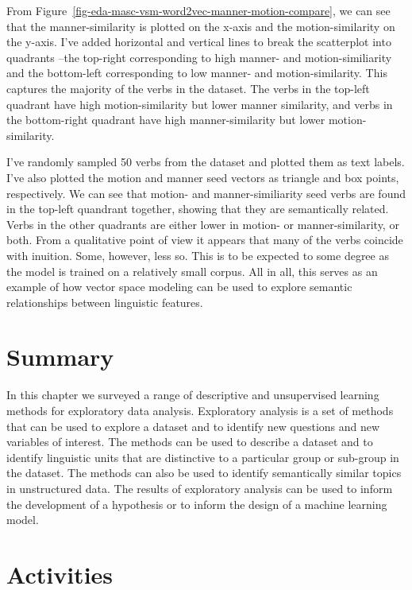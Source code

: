 \documentclass[
  letterpaper,
  DIV=11,
  numbers=noendperiod]{scrreport}
\theoremstyle{definition}
\theoremstyle{remark}
\begin{document}
From Figure~\ref{fig-eda-masc-vsm-word2vec-manner-motion-compare}, we
can see that the manner-similarity is plotted on the x-axis and the
motion-similarity on the y-axis. I've added horizontal and vertical
lines to break the scatterplot into quadrants --the top-right
corresponding to high manner- and motion-similiarity and the bottom-left
corresponding to low manner- and motion-similarity. This captures the
majority of the verbs in the dataset. The verbs in the top-left quadrant
have high motion-similarity but lower manner similarity, and verbs in
the bottom-right quadrant have high manner-similarity but lower
motion-similarity.

I've randomly sampled 50 verbs from the dataset and plotted them as text
labels. I've also plotted the motion and manner seed vectors as triangle
and box points, respectively. We can see that motion- and
manner-similiarity seed verbs are found in the top-left quandrant
together, showing that they are semantically related. Verbs in the other
quadrants are either lower in motion- or manner-similarity, or both.
From a qualitative point of view it appears that many of the verbs
coincide with inuition. Some, however, less so. This is to be expected
to some degree as the model is trained on a relatively small corpus. All
in all, this serves as an example of how vector space modeling can be
used to explore semantic relationships between linguistic features.

\hypertarget{summary-7}{%
\section{Summary}\label{summary-7}}

In this chapter we surveyed a range of descriptive and unsupervised
learning methods for exploratory data analysis. Exploratory analysis is
a set of methods that can be used to explore a dataset and to identify
new questions and new variables of interest. The methods can be used to
describe a dataset and to identify linguistic units that are distinctive
to a particular group or sub-group in the dataset. The methods can also
be used to identify semantically similar topics in unstructured data.
The results of exploratory analysis can be used to inform the
development of a hypothesis or to inform the design of a machine
learning model.

\hypertarget{activities-6}{%
\section*{Activities}\label{activities-6}}
\end{document}
